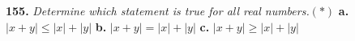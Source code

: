 \documentclass{ximera}
\begin{document}
\begin{problem}
\textbf{155.} \emph{Determine which statement is true for all real numbers.}\quad $(*)$ \quad
  \textbf{a.} $|x + y| \le |x| + |y|$ \qquad
  \textbf{b.} $|x + y| = |x| + |y|$ \qquad
  \textbf{c.} $|x + y| \ge |x| + |y|$

\begin{multipleChoice}
\end{multipleChoice}
\end{problem}
\end{document}
